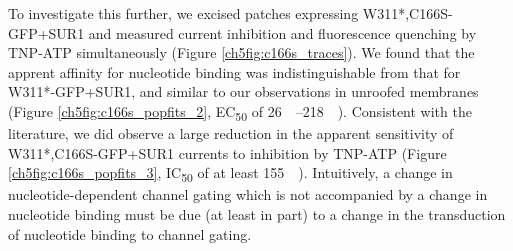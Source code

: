 To investigate this further, we excised patches expressing W311*,C166S-GFP+SUR1 and measured current inhibition and fluorescence quenching by TNP-ATP simultaneously (Figure \ref{ch5fig:c166s_traces}).
We found that the apprent affinity for nucleotide binding was indistinguishable from that for W311*-GFP+SUR1, and similar to our observations in unroofed membranes (Figure \ref{ch5fig:c166s_popfits_2}, EC\textsubscript{50} of \SIrange{26}{218}{\micro\Molar}).
Consistent with the literature, we did observe a large reduction in the apparent sensitivity of W311*,C166S-GFP+SUR1 currents to inhibition by TNP-ATP (Figure \ref{ch5fig:c166s_popfits_3}, IC\textsubscript{50} of at least \SI{155}{\micro\Molar}).
Intuitively, a change in nucleotide-dependent channel gating which is not accompanied by a change in nucleotide binding must be due (at least in part) to a change in the transduction of nucleotide binding to channel gating.

